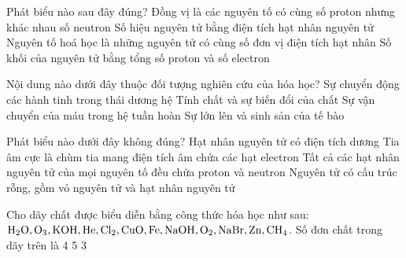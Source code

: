 \documentclass[11pt,a4paper]{article}
\begin{document}
\begin{ex}
Phát biểu nào sau đây đúng?
\choice
{Đồng vị là các nguyên tố có cùng số proton nhưng khác nhau số neutron}
{Số hiệu nguyên tử bằng điện tích hạt nhân nguyên tử}
{\True Nguyên tố hoá học là những nguyên tử có cùng số đơn vị điện tích hạt nhân}
{Số khối của nguyên tử bằng tổng số proton và số electron}

\end{ex}
\begin{ex}
Nội dung nào dưới đây thuộc đối tượng nghiên cứu của hóa học?
\choice
{Sự chuyển động các hành tinh trong thái dương hệ}
{\True Tính chất và sự biến đổi của chất}
{Sự vận chuyển của máu trong hệ tuần hoàn}
{Sự lớn lên và sinh sản của tế bào}

\end{ex}
\begin{ex}
Phát biểu nào dưới đây không đúng?
\choice
{Hạt nhân nguyên tử có điện tích dương}
{Tia âm cực là chùm tia mang điện tích âm chứa các hạt electron}
{\True Tất cả các hạt nhân nguyên tử của mọi nguyên tố đều chứa proton và neutron}
{Nguyên tử có cấu trúc rỗng, gồm vỏ nguyên tử và hạt nhân nguyên tử}

\end{ex}
\begin{ex}
Cho dãy chất được biểu diễn bằng công thức hóa học như sau: $\ce{H2O, O3, KOH, He, Cl2, CuO, Fe, NaOH, O2, NaBr, Zn, CH4}$. Số đơn chất trong dãy trên là
\choice
{4}
{}
{5}
{3}

\end{ex}
\end{document}
